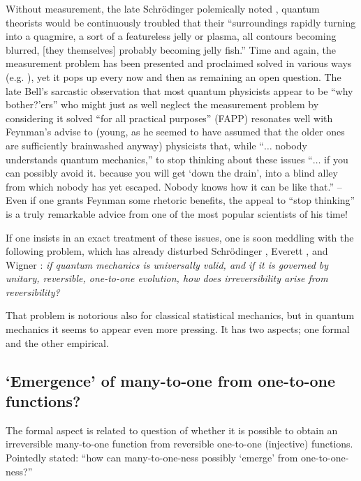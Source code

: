 \documentclass[%
 preprint,
 showpacs,
 showkeys,
 preprintnumbers,
 amsmath,amssymb,
 aps,
  pra,
  longbibliography,
 ]{revtex4-1}
\begin{document}
Without measurement, the late Schr\"odinger polemically noted \cite{schroedinger-interpretation}, quantum theorists would
be continuously troubled that their
``surroundings rapidly turning into a quagmire, a sort of a featureless jelly or plasma,
all contours becoming blurred, [they themselves] probably becoming jelly fish.''
Time and again, the measurement problem has been
presented \cite{wheeler-Zurek:83} and proclaimed solved in various ways (e.g. \cite{RevModPhys.75.715}),
yet it pops up every now and then as remaining an open question.
The late Bell's sarcastic observation  \cite{bell-a} that most quantum physicists appear to be
``why bother?'ers'' \cite{dirac-noworries} who might just as well neglect the
measurement problem by considering it solved ``for all practical purposes'' (FAPP)
resonates well with Feynman's advise
to (young, as he seemed to have assumed that the older ones are sufficiently brainwashed anyway)
physicists \cite[p.~129]{feynman-law} that, while ``$\ldots$ nobody
understands quantum mechanics,'' to stop thinking about these issues ``$\ldots$ if  you  can possibly avoid it.
because you will get
`down the drain', into a blind alley from which nobody has
yet escaped. Nobody knows how it can be like that.''  --
Even if one grants Feynman some rhetoric benefits,
the appeal to ``stop thinking''
is a truly remarkable advice from one of the most popular scientists of his time!



If one insists in an exact treatment of these issues, one is soon meddling with the following problem,
which has already disturbed Schr\"odinger \cite{schrodinger,schroedinger-interpretation}, Everett \cite[p.~454]{everett}, and Wigner \cite[p.~173]{wigner:mb}:
{\em if quantum mechanics is universally valid, and if it is governed by unitary, reversible, one-to-one evolution,
how does irreversibility arise from reversibility?}


That problem is notorious also for classical statistical mechanics, but in quantum mechanics it seems
to appear even more pressing.
It has two aspects; one formal and the other empirical.

\subsection{`Emergence' of many-to-one from one-to-one functions?}

The formal aspect is related to question of whether it is possible to obtain an irreversible many-to-one function
from reversible one-to-one (injective) functions.
Pointedly stated: ``how can many-to-one-ness possibly `emerge' from one-to-one-ness?''
\end{document}
